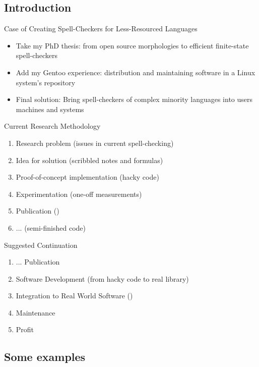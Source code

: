 \documentclass[t,12pt]{beamer}
\begin{document}
\subsection{Introduction}

\begin{frame}{Case of Creating Spell-Checkers for Less-Resourced Languages}
    \begin{itemize}
        \item Take my PhD thesis: from open source morphologies to efficient
            finite-state spell-checkers
        \item Add my Gentoo experience: distribution and maintaining software
            in a Linux system's repository
        \item Final solution: Bring spell-checkers of
            complex minority languages into users machines and systems
    \end{itemize}
\end{frame}

\begin{frame}{Current Research Methodology}
    \begin{enumerate}
        \item Research problem (issues in current spell-checking)
        \item Idea for solution (scribbled notes and formulas)
        \item Proof-of-concept implementation (hacky code)
        \item Experimentation (one-off measurements)
        \item Publication ()
        \item ... (semi-finished code)
    \end{enumerate}
\end{frame}

\begin{frame}{Suggested Continuation}
    \begin{enumerate}
        \item ... Publication 
        \item Software Development (from hacky code to real library)
        \item Integration to Real World Software ()
        \item Maintenance
        \item Profit
    \end{enumerate}
\end{frame}

\subsection{Some examples}
\end{document}
